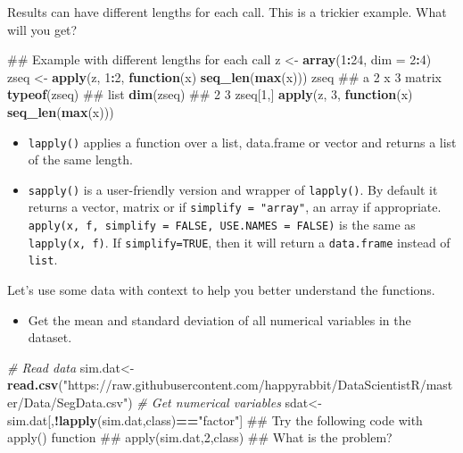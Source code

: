 \documentclass[12pt,]{krantz}
\newenvironment{Shaded}{\begin{snugshade}}{\end{snugshade}}
\newcommand{\KeywordTok}[1]{\textcolor[rgb]{0.13,0.29,0.53}{\textbf{#1}}}
\newcommand{\DataTypeTok}[1]{\textcolor[rgb]{0.13,0.29,0.53}{#1}}
\newcommand{\DecValTok}[1]{\textcolor[rgb]{0.00,0.00,0.81}{#1}}
\newcommand{\StringTok}[1]{\textcolor[rgb]{0.31,0.60,0.02}{#1}}
\newcommand{\CommentTok}[1]{\textcolor[rgb]{0.56,0.35,0.01}{\textit{#1}}}
\newcommand{\ControlFlowTok}[1]{\textcolor[rgb]{0.13,0.29,0.53}{\textbf{#1}}}
\newcommand{\OperatorTok}[1]{\textcolor[rgb]{0.81,0.36,0.00}{\textbf{#1}}}
\newcommand{\NormalTok}[1]{#1}
\providecommand{\tightlist}{%
  \setlength{\itemsep}{0pt}\setlength{\parskip}{0pt}}
\theoremstyle{definition}
\theoremstyle{definition}
\theoremstyle{definition}
\theoremstyle{remark}
\begin{document}
Results can have different lengths for each call. This is a trickier
example. What will you get?

\begin{Shaded}
\begin{Highlighting}[]
\NormalTok{## Example with different lengths for each call}
\NormalTok{z <-}\StringTok{ }\KeywordTok{array}\NormalTok{(}\DecValTok{1}\OperatorTok{:}\DecValTok{24}\NormalTok{, }\DataTypeTok{dim =} \DecValTok{2}\OperatorTok{:}\DecValTok{4}\NormalTok{)}
\NormalTok{zseq <-}\StringTok{ }\KeywordTok{apply}\NormalTok{(z, }\DecValTok{1}\OperatorTok{:}\DecValTok{2}\NormalTok{, }\ControlFlowTok{function}\NormalTok{(x) }\KeywordTok{seq_len}\NormalTok{(}\KeywordTok{max}\NormalTok{(x)))}
\NormalTok{zseq         ## a 2 x 3 matrix}
\KeywordTok{typeof}\NormalTok{(zseq) ## list}
\KeywordTok{dim}\NormalTok{(zseq) ## 2 3}
\NormalTok{zseq[}\DecValTok{1}\NormalTok{,]}
\KeywordTok{apply}\NormalTok{(z, }\DecValTok{3}\NormalTok{, }\ControlFlowTok{function}\NormalTok{(x) }\KeywordTok{seq_len}\NormalTok{(}\KeywordTok{max}\NormalTok{(x)))}
\end{Highlighting}
\end{Shaded}

\begin{itemize}
\tightlist
\item
  \texttt{lapply()} applies a function over a list, data.frame or vector
  and returns a list of the same length.
\item
  \texttt{sapply()} is a user-friendly version and wrapper of
  \texttt{lapply()}. By default it returns a vector, matrix or if
  \texttt{simplify\ =\ "array"}, an array if appropriate.
  \texttt{apply(x,\ f,\ simplify\ =\ FALSE,\ USE.NAMES\ =\ FALSE)} is
  the same as \texttt{lapply(x,\ f)}. If \texttt{simplify=TRUE}, then it
  will return a \texttt{data.frame} instead of \texttt{list}.
\end{itemize}

Let's use some data with context to help you better understand the
functions.

\begin{itemize}
\tightlist
\item
  Get the mean and standard deviation of all numerical variables in the
  dataset.
\end{itemize}

\begin{Shaded}
\begin{Highlighting}[]
\CommentTok{# Read data}
\NormalTok{sim.dat<-}\KeywordTok{read.csv}\NormalTok{(}\StringTok{"https://raw.githubusercontent.com/happyrabbit/DataScientistR/master/Data/SegData.csv"}\NormalTok{)}
\CommentTok{# Get numerical variables}
\NormalTok{sdat<-sim.dat[,}\OperatorTok{!}\KeywordTok{lapply}\NormalTok{(sim.dat,class)}\OperatorTok{==}\StringTok{"factor"}\NormalTok{]}
\NormalTok{## Try the following code with apply() function}
\NormalTok{## apply(sim.dat,2,class)}
\NormalTok{## What is the problem?}
\end{Highlighting}
\end{Shaded}
\end{document}
